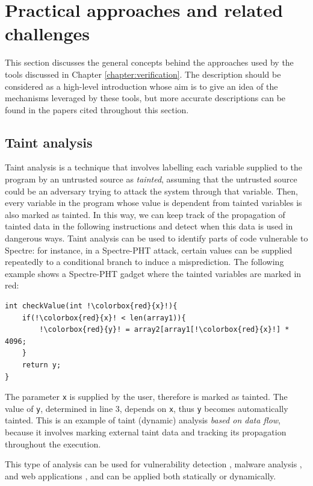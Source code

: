 \documentclass[12pt,a4paper]{book}
\theoremstyle{definition}
\begin{document}
	\section{Practical approaches and related challenges}
	This section discusses the general concepts behind the approaches used by the tools discussed in Chapter \ref{chapter:verification}. The description should be considered as a high-level introduction whose aim is to give an idea of the mechanisms leveraged by these tools, but more accurate descriptions can be found in the papers cited throughout this section.
	\subsection{Taint analysis}\label{sec:taint}
	Taint analysis is a technique that involves labelling each variable supplied to the program by an untrusted source as \textit{tainted}, assuming that the untrusted source could be an adversary trying to attack the system  through that variable.
	Then, every variable in the program whose value is dependent from tainted variables is also marked as tainted. In this way, we can keep track of the propagation of tainted data in the following instructions and detect when this data is used in dangerous ways. Taint analysis can be used to identify parts of code vulnerable to Spectre: for instance, in a Spectre-PHT attack, certain values can be supplied repeatedly to a conditional branch to induce a misprediction. The following example shows a Spectre-PHT gadget where the tainted variables are marked in red:
	
	\vspace{3mm}
	\begin{minipage}{.6\textwidth}
	\begin{lstlisting}[escapechar=!]
int checkValue(int !\colorbox{red}{x}!){
	if(!\colorbox{red}{x}! < len(array1)){
		!\colorbox{red}{y}! = array2[array1[!\colorbox{red}{x}!] * 4096;
	}
	return y;
}
	\end{lstlisting}
	\end{minipage}

	The parameter \texttt{x} is supplied by the user, therefore is marked as tainted. The value of \texttt{y}, determined in line 3, depends on \texttt{x}, thus \texttt{y} becomes automatically tainted. This is an example of taint (dynamic) analysis \textit{based on data flow}, because it involves marking external taint data and tracking its propagation throughout the execution.
	
	This type of analysis can be used for vulnerability detection \cite{Newsome2005}, malware analysis \cite{Bayer2009} \cite{Yin2007}, and web applications \cite{Balzarotti2008} \cite{NguyenTuong2005}, and can be applied both statically or dynamically.
	
\end{document}
